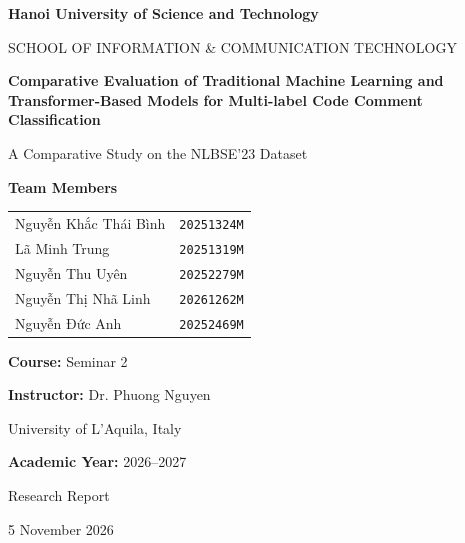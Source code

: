 \documentclass[11pt,a4paper]{article}
\begin{document}
\hypersetup{pageanchor=false}
\begin{titlepage}
\centering
{\large\bfseries Hanoi University of Science and Technology\par}
\vspace{3mm}
{\normalsize SCHOOL OF INFORMATION \& COMMUNICATION TECHNOLOGY\par}
\vfill
{\color{ink}\LARGE\bfseries Comparative Evaluation of Traditional Machine Learning and Transformer-Based Models for Multi-label Code Comment Classification\par}
\vspace{10mm}
{\large A Comparative Study on the NLBSE'23 Dataset\par}
\vspace{10mm}
{\large\bfseries Team Members\par}
\vspace{4mm}
\begin{tabular}{@{}ll@{}}
Nguyễn Khắc Thái Bình & \texttt{20251324M}\\[3pt]
Lã Minh Trung & \texttt{20251319M}\\[3pt]
Nguyễn Thu Uyên & \texttt{20252279M}\\[3pt]
Nguyễn Thị Nhã Linh & \texttt{20261262M}\\[3pt]
Nguyễn Đức Anh & \texttt{20252469M}\\
\end{tabular}
\vspace{8mm}
\par\textbf{Course:} Seminar 2\par
\textbf{Instructor:} Dr. Phuong Nguyen\par
University of L'Aquila, Italy\par
\textbf{Academic Year:} 2026--2027\par
\vfill
{\large Research Report\par}
{5 November 2026\par}
\end{titlepage}
\hypersetup{pageanchor=true}
\end{document}
